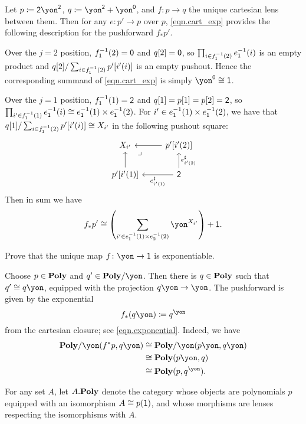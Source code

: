 \documentclass[Book-Poly]{subfiles}
\begin{document}
\begin{example}
Let $p\coloneqq\2\yon^\2$, $q\coloneqq\yon^\2+\yon^\0$, and $f\colon p\to q$ the unique cartesian lens between them.
Then for any $e\colon p'\to p$ over $p$, \eqref{eqn.cart_exp} provides the following description for the pushforward $f_*p'$.

Over the $j=2$ position, $f_\1\inv(2)=\0$ and $q[2]=\0$, so $\prod_{i \in f_\1\inv(2)} e_\1\inv(i)$ is an empty product and $q[2]/\sum_{i\in f_\1\inv(2)} p'[i'(i)]$ is an empty pushout.
Hence the corresponding summand of \eqref{eqn.cart_exp} is simply $\yon^\0\cong\1$.

Over the $j=1$ position, $f_\1\inv(1)=\2$ and $q[1]=p[1]=p[2]=\2$, so $\prod_{i'\in f_\1\inv(1)} e_\1\inv(i) \iso e_\1\inv(1)\times e_\1\inv(2)$.
For $i' \in e_\1\inv(1) \times e_\1\inv(2)$, we have that $q[1]/\sum_{i\in f_\1\inv(2)} p'[i'(i)] \iso X_{i'}$ in the following pushout square:
\[
\begin{tikzcd}
	X_{i'} \ar[from=r] \ar[from=d] &
	p'[i'(2)] \ar[from=d, "e^\sharp_{i'(2)}"'] \\
	p'[i'(1)] \ar[from=r, "e^\sharp_{i'(1)}"] &
	\2 \ar[ul, phantom, very near end, "\lrcorner"]
\end{tikzcd}
\]
Then in sum we have
\[
    f_*p' \iso \left(\sum_{i' \in e_\1\inv(1) \times e_2\inv(2)} \yon^{X_{i'}}\right) + \1.
\]
\end{example}

\begin{exercise}
Prove that the unique map $f\colon\yon\to\1$ is exponentiable.
\begin{solution}
Choose $p\in\poly$ and $q'\in\poly/\yon$. Then there is $q\in\poly$ such that $q'\cong q\yon$, equipped with the projection $q\yon\to\yon$. The pushforward is given by the exponential
\[f_*(q\yon)\coloneqq q^\yon\]
from the cartesian closure; see \eqref{eqn.exponential}. Indeed, we have
\begin{align*}
	\poly/\yon(f^*p,q\yon)&\cong
	\poly/\yon(p\yon,q\yon)\\&\cong
	\poly(p\yon,q)\\&\cong
	\poly(p,q^\yon).
\end{align*}
\end{solution}
\end{exercise}

For any set $A$, let $\poly[A.]$ denote the category whose objects are polynomials $p$ equipped with an isomorphism $A\cong p(\1)$, and whose morphisms are lenses respecting the isomorphisms with $A$.
\end{document}
